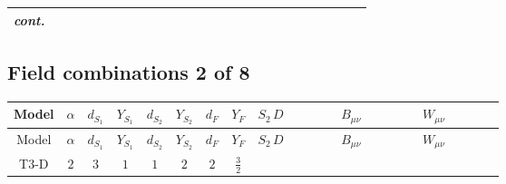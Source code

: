 \documentclass[8pt]{article}
\begin{document}
\begin{landscape}
\begin{longtable}{@{}cccccccc >{\raggedright\arraybackslash}p{0.21\linewidth} >{\raggedright\arraybackslash}p{0.21\linewidth} >{\raggedright\arraybackslash}p{0.21\linewidth}@{}}
\textit{cont.} &  &  &  &  &  &  &  & \scriptsize\adjustbox{max width=\linewidth}{$\begin{gathered} -\frac{2 \hbar  \overline{y_{1,i_1,r_1}} S_{1,j_3} S_{1,j_4} y_{1,i_1,r_1} S_{1,j_1}{}^{\dagger } S_{1,j_2}{}^{\dagger } \mathcal{I}_{S_1,j_1,j_3,j_2,j_4}{}^2 \lambda_{S_1}^{(1)}^{(2)}}{\sqrt{3} \epsilon } \\ -\frac{\hbar  \overline{y_{1,i_1,r_1}} S_{1,j_3} S_{1,j_4} y_{1,i_1,r_1} S_{1,j_1}{}^{\dagger } S_{1,j_2}{}^{\dagger } \mathcal{I}_{S_1,j_1,j_3,j_2,j_4}{}^2 \lambda_{S_1}^{(1)}^{(2)}}{\sqrt{3}}\end{gathered}$} &  &  \\
\midrule
\bottomrule
\end{longtable}
\clearpage
\subsection*{Field combinations 2 of 8}
\begin{longtable}{@{}cccccccc >{\raggedright\arraybackslash}p{0.21\linewidth} >{\raggedright\arraybackslash}p{0.21\linewidth} >{\raggedright\arraybackslash}p{0.21\linewidth}@{}}
\toprule
Model & $\alpha$ & $d_{S_1}$ & $Y_{S_1}$ & $d_{S_2}$ & $Y_{S_2}$ & $d_F$ & $Y_F$ & $S_2\,D$ & $B_{\mu\nu}$ & $W_{\mu\nu}$ \\
\midrule
\endfirsthead
\toprule
Model & $\alpha$ & $d_{S_1}$ & $Y_{S_1}$ & $d_{S_2}$ & $Y_{S_2}$ & $d_F$ & $Y_F$ & $S_2\,D$ & $B_{\mu\nu}$ & $W_{\mu\nu}$ \\
\midrule
\endhead
T3-D & $2$ & $3$ & $1$ & $1$ & $2$ & $2$ & $\frac{3}{2}$ & \scriptsize\adjustbox{max width=\linewidth}{$\begin{gathered} +D_{\mu _1}\left(S_2\right){}^{\dagger } D_{\mu _1}\left(S_2\right)\end{gathered}$} & \scriptsize\adjustbox{max width=\linewidth}{$\begin{gathered} -\frac{9 \hbar  B_{\mu _1\mu _2}^2}{2 \epsilon }\end{gathered}$} & \scriptsize\adjustbox{max width=\linewidth}{$\begin{gathered} -\frac{\hbar  \left(W_{\mu _1\mu _2}^{A_1}\right){}^2}{2 \epsilon }\end{gathered}$} \\
\midrule
\bottomrule
\end{longtable}
\clearpage

\end{landscape}
\end{document}
